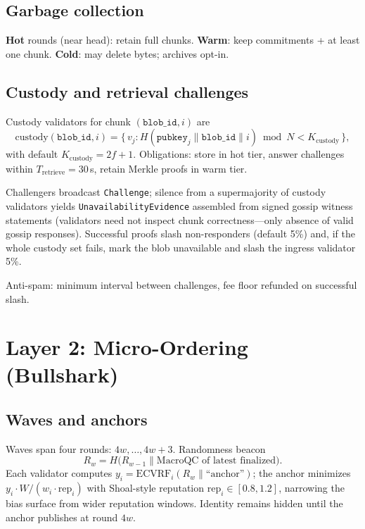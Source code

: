 \documentclass[11pt,a4paper,twoside]{report}
\theoremstyle{definition}
\begin{document}
\section{Garbage collection}
\textbf{Hot} rounds (near head): retain full chunks. \textbf{Warm}: keep commitments + at least one chunk. \textbf{Cold}: may delete bytes; archives opt-in.

\section{Custody and retrieval challenges}
\label{sec:challenges}
Custody validators for chunk $(\texttt{blob\_id}, i)$ are
\begin{equation}
  \mathrm{custody}(\texttt{blob\_id}, i) = \bigl\{\, v_j : H(\texttt{pubkey}_j \| \texttt{blob\_id} \| i) \bmod N < K_{\mathrm{custody}} \,\bigr\},
\end{equation}
with default $K_{\mathrm{custody}} = 2f{+}1$. Obligations: store in hot tier, answer challenges within $T_{\mathrm{retrieve}} = 30$\,s, retain Merkle proofs in warm tier.

Challengers broadcast \texttt{Challenge}; silence from a supermajority of custody validators yields \texttt{UnavailabilityEvidence} assembled from signed gossip witness statements (validators need not inspect chunk correctness---only absence of valid gossip responses). Successful proofs slash non-responders (default 5\%) and, if the whole custody set fails, mark the blob unavailable and slash the ingress validator 5\%.

Anti-spam: minimum interval between challenges, fee floor refunded on successful slash.

\chapter{Layer 2: Micro-Ordering (Bullshark)}
\label{ch:micro}

\section{Waves and anchors}
Waves span four rounds: $4w,\ldots,4w{+}3$. Randomness beacon
\begin{equation}
  R_w = H\bigl(R_{w-1} \| \text{MacroQC of latest finalized}\bigr).
\end{equation}
Each validator computes $y_i = \mathrm{ECVRF}_i(R_w \| \text{``anchor''})$; the anchor minimizes $y_i \cdot W / (w_i \cdot \mathrm{rep}_i)$ with Shoal-style reputation $\mathrm{rep}_i \in [0.8, 1.2]$, narrowing the bias surface from wider reputation windows. Identity remains hidden until the anchor publishes at round $4w$.
\end{document}
